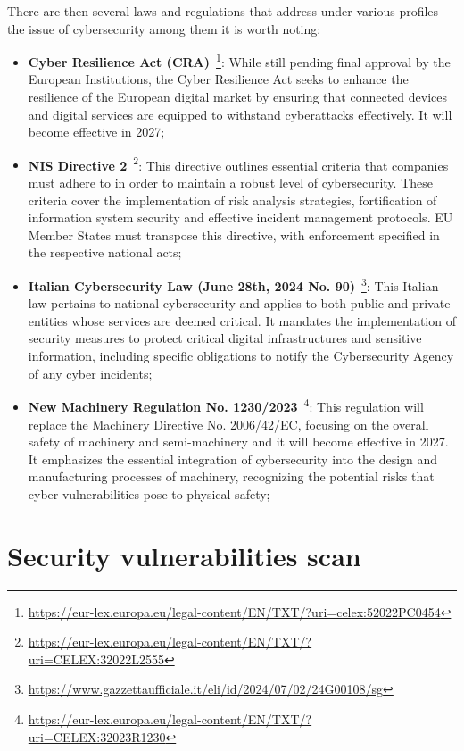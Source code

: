 There are then several laws and regulations that address under various profiles the issue of cybersecurity among them it is worth noting:~\cite{cybersecurity-standards-regulations-compliance}
\begin{itemize}
  \item \textbf{Cyber Resilience Act (CRA)}~\footnote{\url{https://eur-lex.europa.eu/legal-content/EN/TXT/?uri=celex:52022PC0454}}: While still pending final approval by the European Institutions, the Cyber Resilience Act seeks to enhance the resilience of the European digital market by ensuring that connected devices and digital services are equipped to withstand cyberattacks effectively. It will become effective in 2027;
  \item  \textbf{NIS Directive 2}~\footnote{\url{https://eur-lex.europa.eu/legal-content/EN/TXT/?uri=CELEX:32022L2555}}: This directive outlines essential criteria that companies must adhere to in order to maintain a robust level of cybersecurity. These criteria cover the implementation of risk analysis strategies, fortification of information system security and effective incident management protocols. EU Member States must transpose this directive, with enforcement specified in the respective national acts;
  \item \textbf{Italian Cybersecurity Law (June 28th, 2024 No. 90)}~\footnote{\url{https://www.gazzettaufficiale.it/eli/id/2024/07/02/24G00108/sg}}: This Italian law pertains to national cybersecurity and applies to both public and private entities whose services are deemed critical. It mandates the implementation of security measures to protect critical digital infrastructures and sensitive information, including specific obligations to notify the Cybersecurity Agency of any cyber incidents;
  \item \textbf{New Machinery Regulation No. 1230/2023}~\footnote{\url{https://eur-lex.europa.eu/legal-content/EN/TXT/?uri=CELEX:32023R1230}}: This regulation will replace the Machinery Directive No. 2006/42/EC, focusing on the overall safety of machinery and semi-machinery and it will become effective in 2027. It emphasizes the essential integration of cybersecurity into the design and manufacturing processes of machinery, recognizing the potential risks that cyber vulnerabilities pose to physical safety;
\end{itemize}

\section{Security vulnerabilities scan}

